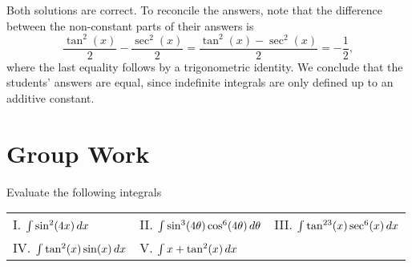 \documentclass[noauthor]{ximera}
\begin{document}
\begin{freeResponse}
Both solutions are correct. To reconcile the answers, note that the difference between the non-constant parts of their answers is 
$$
\frac{\tan^2 (x)}{2} - \frac{\sec^2(x)}{2} = \frac{\tan^2(x) - \sec^2(x)}{2}  = -\frac{1}{2},
$$
where the last equality follows by a trigonometric identity. We conclude that the students' answers are equal, since indefinite integrals are only defined up to an additive constant.
\end{freeResponse}

\section{Group Work}

\begin{problem}
Evaluate the following integrals

\begin{center}
\begin{tabular}{lll}
I. $\int \sin^2(4x) \mathop{}\!d x$ \hspace{10mm} & II. $\int \sin^3 (4 \theta) \cos^6 (4\theta) \mathop{}\!d \theta$ \hspace{.2in} & III. $\int \tan^{23}(x) \sec^6 (x) \mathop{}\!d x$  \\
IV. $\int \tan^2(x) \sin (x) \mathop{}\!d x$ & V. $\int x+ \tan^2(x) \mathop{}\!d x$
\end{tabular}
\end{center}
\end{problem}
\end{document}
